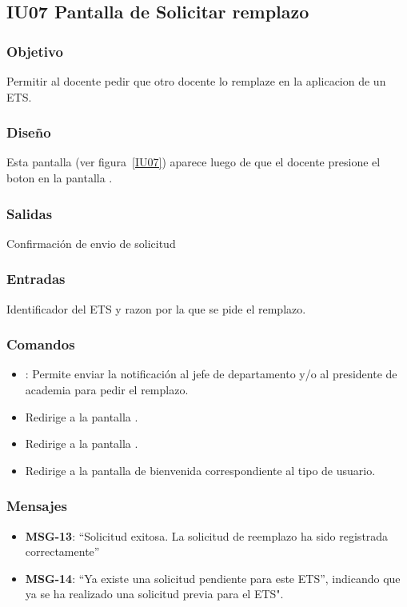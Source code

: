 \subsection{IU07 Pantalla de Solicitar remplazo}

\subsubsection{Objetivo}
Permitir al docente pedir que otro docente lo remplaze en la aplicacion de un ETS.

\subsubsection{Diseño}
Esta pantalla  (ver figura~\ref{IU07}) aparece luego de que el docente presione el boton  en la pantalla .


\subsubsection{Salidas}
Confirmación de envio de solicitud

\subsubsection{Entradas}
Identificador del ETS y razon por la que se pide el remplazo.

\subsubsection{Comandos}
\begin{itemize}
	\item {}: Permite enviar la notificación al jefe de departamento y/o al presidente de academia para pedir el remplazo.
	\item {} Redirige a la pantalla .
    \item {} Redirige a la pantalla .
    \item {} Redirige a la pantalla de bienvenida correspondiente al tipo de usuario.
\end{itemize}

\subsubsection{Mensajes}

\begin{itemize}
	\item \textbf{MSG-13}: ``Solicitud exitosa. La solicitud de reemplazo ha sido registrada correctamente''
	\item \textbf{MSG-14}: ``Ya existe una solicitud pendiente para este ETS'', indicando que ya se ha realizado una solicitud previa para el ETS".
\end{itemize}

